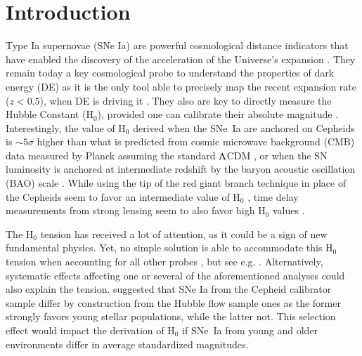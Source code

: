 \documentclass[]{aa} %
\begin{document}
\maketitle

\section{Introduction}

Type Ia supernovae (SNe Ia) are powerful cosmological distance indicators that
have enabled the discovery of the acceleration of the Universe's expansion
\citep{riess1998, perlmutter1999}. They remain today a key cosmological probe to
understand the properties of dark energy (DE) as it is the only tool able to
precisely map the recent expansion rate ($z<0.5$), when DE is driving it
\citep[e.g.][]{scolnicastro2020}. They also are key to directly measure the
Hubble Constant (H$_0$), provided one can calibrate their absolute magnitude
\citep{riess2016, freedman2019}. Interestingly, the value of H$_0$ derived when
the SNe~Ia are anchored on Cepheids \citep[the SH0ES project,][]{riess2009,
riess2016} is $\sim5\sigma$ higher than what is predicted from cosmic microwave
background (CMB) data measured by Planck assuming the standard $\Lambda$CDM
\citep{planck2018, riess2019, reid2019}, or when the SN luminosity is anchored
at intermediate redshift by the baryon acoustic oscillation (BAO) scale
\citep{feeney2019}. While using the tip of the red giant branch technique in
place of the Cepheids seem to favor an intermediate value of H$_0$
\citep{freedman2019, freedman2020}, time delay measurements from strong lensing
seem to also favor high H$_0$ values \citep{wong2019}.

The H$_0$ tension has received a lot of attention, as it could be a sign of new
fundamental physics. Yet, no simple solution is able to accommodate this H$_0$
tension when accounting for all other probes \citep{knox2019}, but see e.g.
\cite{poulin2019}. Alternatively, systematic effects affecting one or several
of the aforementioned analyses could also explain the tension.
\cite{rigault2015} suggested that SNe Ia from the Cepheid calibrator sample
differ by construction from the Hubble flow sample ones as the former
strongly favors young stellar populations, while the latter not. This
selection effect would impact the derivation of H$_0$ if SNe~Ia from young and
older environments differ in average standardized magnitudes. 
\end{document}
